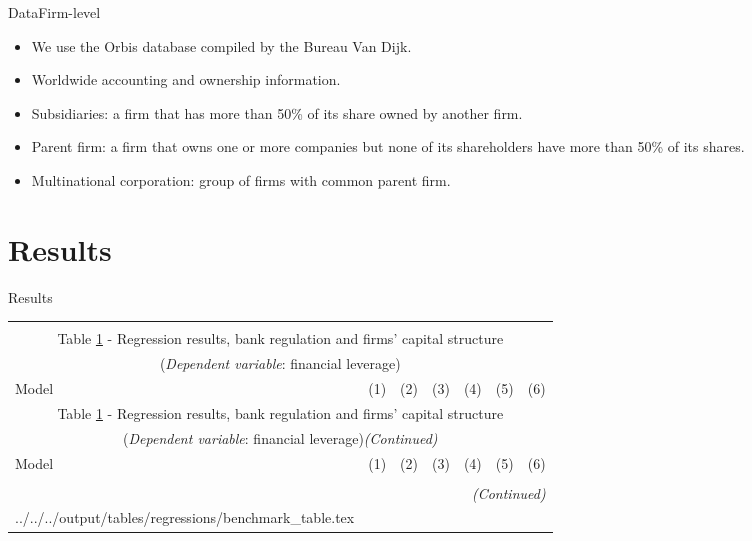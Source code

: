 \documentclass{beamer}
\makeatletter
\newcommand\primitiveinput[1]
{\@@input #1 }
\makeatother
\begin{document}
\begin{frame}{Data}{Firm-level}
\begin{itemize}
	\item We use the Orbis database compiled by the Bureau Van Dijk.
	\vspace{\baselineskip}
	\item Worldwide accounting and ownership information.
	\vspace{\baselineskip}
	\item Subsidiaries: a firm that has more than 50\% of its share owned by another firm.
	\vspace{\baselineskip}
	\item Parent firm: a firm that owns one or more companies but none of its shareholders have more than 50\% of its shares.
	\vspace{\baselineskip}
	\item Multinational corporation: group of firms with common parent firm.
	
\end{itemize}
\begin{center}
	\begin{tiny}	
	\end{tiny}
\end{center}
\end{frame}

\section{Results}

\begin{frame}{Results}

{\fontsize{6}{7}\selectfont		
\begin{longtable}{lcccccc}\\
	\label{reg:benchmark}\\
	\multicolumn{7}{c}{Table \ref{reg:benchmark} - Regression results, bank regulation and firms' capital structure}\\
	\multicolumn{7}{c}{(\textit{Dependent variable}: financial leverage)}
	\\ \hline \hline \addlinespace
	Model & (1) & (2) & (3) & (4) & (5) & (6) \\  \endfirsthead
	\multicolumn{7}{c}{Table \ref{reg:benchmark} - Regression results, bank regulation and firms' capital structure }\\
	\multicolumn{7}{c}{(\textit{Dependent variable}: financial leverage)\textit{(Continued)}}
	\\ \hline \hline \addlinespace Model & (1) & (2) & (3) & (4) & (5) & (6) \\ \hline \\ \endhead
	\hline
	\multicolumn{7}{r}{{\textit{(Continued)}}}\\ \endfoot 
	\endlastfoot
	\primitiveinput{../../../output/tables/regressions/benchmark_table.tex}
	\hline 			
\end{longtable}		
}

\end{frame}
\end{document}
